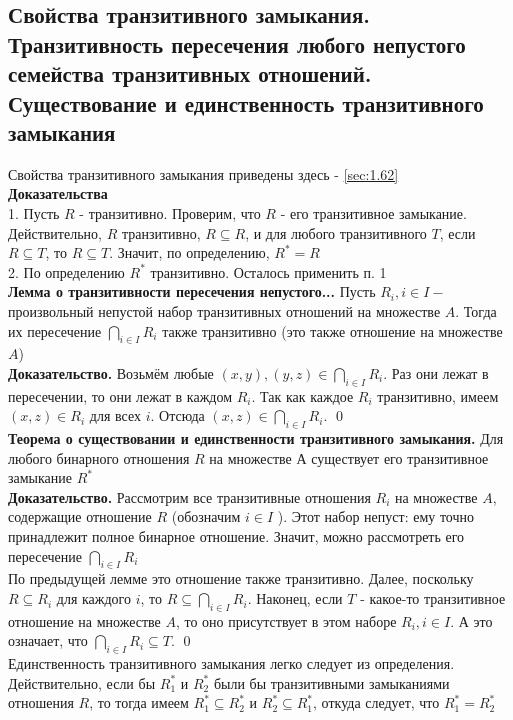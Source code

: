 \documentclass[a4paper]{article}
\begin{document}
\subsection{Свойства транзитивного замыкания. Транзитивность пересечения любого непустого семейства транзитивных отношений. Существование и единственность транзитивного замыкания}
Свойства транзитивного замыкания приведены здесь - \ref{sec:1.62}\\[2mm]
\textbf{Доказательства}\\[2mm]
 1. Пусть $R$ - транзитивно. Проверим, что $R$ - его транзитивное замыкание. Действительно, $R$ транзитивно, $R \subseteq R$, и для любого транзитивного $T$, если $R \subseteq T$, то $R \subseteq T$. Значит, по определению, $R^{*}=R$\\[2mm]
 2. По определению $R^{*}$ транзитивно. Осталось применить п. 1\\[2mm]
\textbf{Лемма о транзитивности пересечения непустого...} Пусть $R_{i}, i \in I-$ произвольный непустой набор транзитивных отношений на множестве $A$. Тогда их пересечение $\bigcap_{i \in I} R_{i}$ также транзитивно (это также отношение на множестве $A$)\\[2mm]
\textbf{Доказательство.} Возьмём любые $(x, y),(y, z) \in \bigcap_{i \in I} R_{i}$. Раз они лежат в пересечении, то они лежат в каждом $R_{i}$. Так как каждое $R_{i}$ транзитивно, имеем $(x, z) \in R_{i}$ для всех $i$. Отсюда $(x, z) \in \bigcap_{i \in I} R_{i}$. \qed\\[2mm]
\textbf{Теорема о существовании и единственности транзитивного замыкания.} Для любого бинарного отношения $R$ на множестве А существует его транзитивное замыкание $R^{*}$\\[2mm]
\textbf{Доказательство.} Рассмотрим все транзитивные отношения $R_{i}$ на множестве $A$, содержащие отношение $R$ (обозначим $i \in I$ ). Этот набор непуст: ему точно принадлежит полное бинарное отношение. Значит, можно рассмотреть его пересечение $\bigcap_{i \in I} R_{i}$\\[2mm]
 По предыдущей лемме это отношение также транзитивно. Далее, поскольку $R \subseteq R_{i}$ для каждого $i$, то $R \subseteq \bigcap_{i \in I} R_{i}$. Наконец, если $T$ - какое-то транзитивное отношение на множестве $A$, то оно присутствует в этом наборе $R_{i}, i \in I$. А это означает, что $\bigcap_{i \in I} R_{i} \subseteq T$. \qed\\[2mm]
 Единственность транзитивного замыкания легко следует из определения. Действительно, если бы $R_{1}^{*}$ и $R_{2}^{*}$ были бы транзитивными замыканиями отношения $R$, то тогда имеем $R_{1}^{*} \subseteq R_{2}^{*}$ и $R_{2}^{*} \subseteq R_{1}^{*}$, откуда следует, что $R_{1}^{*}=R_{2}^{*}$
\end{document}
